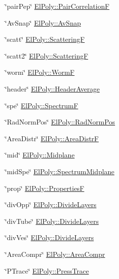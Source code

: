 \begin{DoxyItemize}
\item \char`\"{}pair\+Pep\char`\"{} \hyperlink{classElPoly_a7a3305d9ff38757faf367ced9abf89f0}{El\+Poly\+::\+Pair\+CorrelationF} 
\item \char`\"{}\+Av\+Snap\char`\"{} \hyperlink{classElPoly_aafe33ef0f28995ba7c1a778196decf9b}{El\+Poly\+::\+Av\+Snap} 
\item \char`\"{}scatt\char`\"{} \hyperlink{classElPoly_a1aa4889418bf8c589875e1c77b5262d2}{El\+Poly\+::\+ScatteringF} 
\item \char`\"{}scatt2\char`\"{} \hyperlink{classElPoly_a1aa4889418bf8c589875e1c77b5262d2}{El\+Poly\+::\+ScatteringF} 
\item \char`\"{}worm\char`\"{} \hyperlink{classElPoly_ad6fa03abf69921d9a0759689569e35e9}{El\+Poly\+::\+WormF} 
\item \char`\"{}header\char`\"{} \hyperlink{classElPoly_a2eab2da94941b822d51d4e21bfe64aef}{El\+Poly\+::\+Header\+Average} 
\item \char`\"{}spe\char`\"{} \hyperlink{classElPoly_ada953db0b772595339ef925b5dbd8c62}{El\+Poly\+::\+SpectrumF} 
\item \char`\"{}\+Rad\+Norm\+Pos\char`\"{} \hyperlink{classElPoly_ad3a244bc00c2c8216b1f5cbd36699cdc}{El\+Poly\+::\+Rad\+Norm\+Pos} 
\item \char`\"{}\+Area\+Distr\char`\"{} \hyperlink{classElPoly_a16d58960eae98f1ad67971068f12a22c}{El\+Poly\+::\+Area\+DistrF} 
\item \char`\"{}mid\char`\"{} \hyperlink{classElPoly_a16156b6e530ecc6df93b6ffd3c229f1b}{El\+Poly\+::\+Midplane} 
\item \char`\"{}mid\+Spe\char`\"{} \hyperlink{classElPoly_a669491e5e5c66f665694c9d8908d3109}{El\+Poly\+::\+Spectrum\+Midplane} 
\item \char`\"{}prop\char`\"{} \hyperlink{classElPoly_ae41ade7fbfd977babf42a7e2e6b33f07}{El\+Poly\+::\+PropertiesF} 
\item \char`\"{}div\+Opp\char`\"{} \hyperlink{classElPoly_acffadf1cdc641927dfd8af49eebc2069}{El\+Poly\+::\+Divide\+Layers} 
\item \char`\"{}div\+Tube\char`\"{} \hyperlink{classElPoly_acffadf1cdc641927dfd8af49eebc2069}{El\+Poly\+::\+Divide\+Layers} 
\item \char`\"{}div\+Ves\char`\"{} \hyperlink{classElPoly_acffadf1cdc641927dfd8af49eebc2069}{El\+Poly\+::\+Divide\+Layers} 
\item \char`\"{}\+Area\+Compr\char`\"{} \hyperlink{classElPoly_afbe805e551084aebeee2c673c9b3937a}{El\+Poly\+::\+Area\+Compr} 
\item \char`\"{}\+P\+Trace\char`\"{} \hyperlink{classElPoly_a534f27d79203f0b018acaedf41bbdb13}{El\+Poly\+::\+Press\+Trace} 

\end{DoxyItemize}
